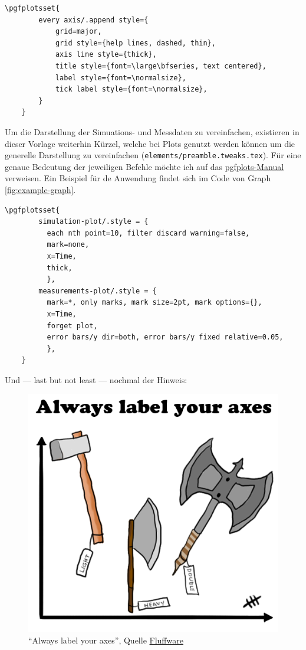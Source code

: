 \begin{Verbatim}[fontsize=\small,gobble=4]
    \pgfplotsset{
        every axis/.append style={
            grid=major,
            grid style={help lines, dashed, thin},
            axis line style={thick},
            title style={font=\large\bfseries, text centered},
            label style={font=\normalsize},
            tick label style={font=\normalsize},
        }
    }
\end{Verbatim}

Um die Darstellung der Simuations- und Messdaten zu vereinfachen, existieren in dieser Vorlage weiterhin Kürzel, welche bei Plots genutzt werden können um die generelle Darstellung zu vereinfachen (\verb+elements/preamble.tweaks.tex+). Für eine genaue Bedeutung der jeweiligen Befehle möchte ich auf das \href{http://mirrors.ctan.org/graphics/pgf/contrib/pgfplots/doc/pgfplots.pdf}{pgfplots-Manual} verweisen. Ein Beispiel für de Anwendung findet sich im Code von Graph \ref{fig:example-graph}. 

\begin{Verbatim}[fontsize=\small,gobble=4]
    \pgfplotsset{
        simulation-plot/.style = {
          each nth point=10, filter discard warning=false,
          mark=none, 
          x=Time,
          thick,
          },
        measurements-plot/.style = {
          mark=*, only marks, mark size=2pt, mark options={},
          x=Time,
          forget plot,
          error bars/y dir=both, error bars/y fixed relative=0.05,
          },
    }
\end{Verbatim}

Und --- last but not least --- nochmal der Hinweis:

\begin{figure}[H]%
    \centering
    
    \includegraphics[width=0.4\columnwidth]{images/examples/axes-fluffware}%
    \caption{"`Always label your axes"', Quelle \href{http://fluffware.tumblr.com/post/4580822773/axes}{Fluffware}}%
    \label{fig:label-your-axes-fluffware}%
\end{figure}
